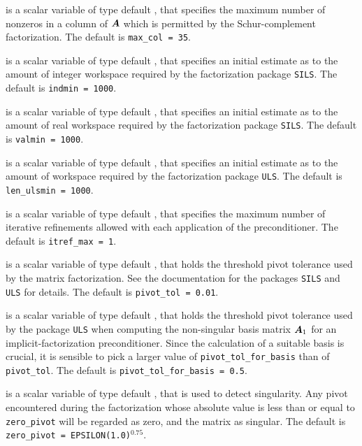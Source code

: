 \documentclass{galahad}
\begin{document}
\begin{description}
 is a scalar variable of type default \integer, that specifies
the maximum number of nonzeros in a column of ${\bm{A}}$ which is permitted
by the Schur-complement factorization.
The default is {\tt max\_col = 35}.

 is a scalar variable of type default \integer, that specifies
an initial estimate as to the amount of integer workspace required by 
the factorization package {\tt SILS}.
The default is {\tt indmin = 1000}.

 is a scalar variable of type default \integer, that specifies
an initial estimate as to the amount of real workspace required by 
the factorization package {\tt SILS}.
The default is {\tt valmin = 1000}.

 is a scalar variable of type default \integer, that specifies
an initial estimate as to the amount of workspace required by 
the factorization package {\tt ULS}.
The default is {\tt len\_ulsmin = 1000}.

 is a scalar variable of type default \integer, that specifies 
the maximum number of iterative refinements allowed with each application 
of the preconditioner.
The default is {\tt itref\_max = 1}.



  is a scalar variable of type default 
\realdp, that holds the
threshold pivot tolerance used by the matrix factorization.  See 
the documentation for the packages {\tt SILS} and {\tt ULS} for details.
The default is {\tt pivot\_tol = 0.01}.

 is a scalar variable of type default 
\realdp, that holds the
threshold pivot  tolerance used by the package {\tt ULS} 
when computing the non-singular basis matrix ${\bm{A}}_1$ for
an implicit-factorization preconditioner. Since the calculation of a
suitable basis is crucial, it is sensible to pick a larger
value of {\tt pivot\_tol\_for\_basis} than of {\tt pivot\_tol}.
The default is {\tt pivot\_tol\_for\_basis = 0.5}.

 is a scalar variable of type default \realdp, 
that is used to detect singularity. Any pivot encountered during the
factorization whose absolute value is less than or equal to  {\tt zero\_pivot}
will be regarded as zero, and the matrix as singular.
The default is {\tt zero\_pivot = EPSILON(1.0)}$^{0.75}$.


\end{description}
\end{document}
